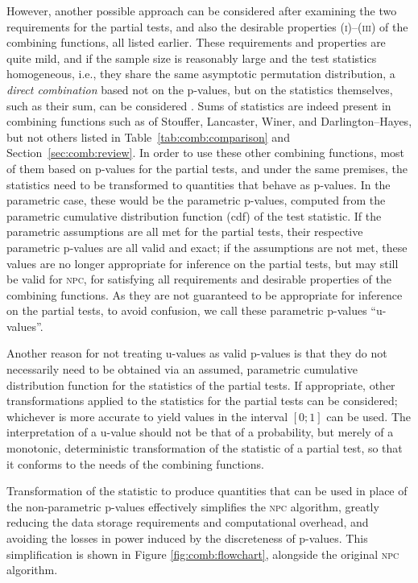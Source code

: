 However, another possible approach can be considered after examining the two requirements for the partial tests, and also the desirable properties (\textsc{i})--(\textsc{iii}) of the combining functions, all listed earlier. These requirements and properties are quite mild, and if the sample size is reasonably large and the test statistics homogeneous, i.e., they share the same asymptotic permutation distribution, a \emph{direct combination} based not on the p-values, but on the statistics themselves, such as their sum, can be considered \citep[page 131]{Pesarin2010}. Sums of statistics are indeed present in combining functions such as of Stouffer, Lancaster, Winer, and Darlington--Hayes, but not others listed in Table~\ref{tab:comb:comparison} and Section~\ref{sec:comb:review}. In order to use these other combining functions, most of them based on p-values for the partial tests, and under the same premises, the statistics need to be transformed to quantities that behave as p-values. In the parametric case, these would be the parametric p-values, computed from the parametric cumulative distribution function (cdf) of the test statistic. If the parametric assumptions are all met for the partial tests, their respective parametric p-values are all valid and exact; if the assumptions are not met, these values are no longer appropriate for inference on the partial tests, but may still be valid for \textsc{npc}, for satisfying all requirements and desirable properties of the combining functions. As they are not guaranteed to be appropriate for inference on the partial tests, to avoid confusion, we call these parametric p-values ``u-values''.

Another reason for not treating u-values as valid p-values is that they do not necessarily need to be obtained via an assumed, parametric cumulative distribution function for the statistics of the partial tests. If appropriate, other transformations applied to the statistics for the partial tests can be considered; whichever is more accurate to yield values in the interval $[0;1]$ can be used. The interpretation of a u-value should not be that of a probability, but merely of a monotonic, deterministic transformation of the statistic of a partial test, so that it conforms to the needs of the combining functions.

Transformation of the statistic to produce quantities that can be used in place of the non-parametric p-values effectively simplifies the \textsc{npc} algorithm, greatly reducing the data storage requirements and computational overhead, and avoiding the losses in power induced by the discreteness of p-values. This simplification is shown in Figure \ref{fig:comb:flowchart}, alongside the original \textsc{npc} algorithm.

